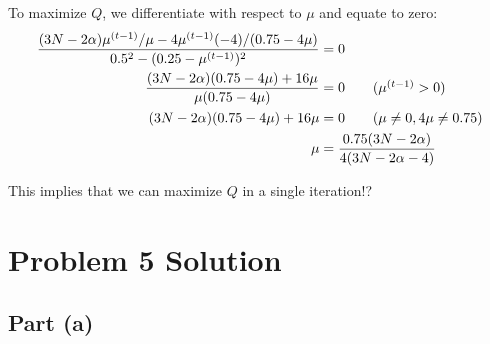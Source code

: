 \documentclass[11pt,a4paper,titlepage]{article}
\begin{document}
To maximize $Q$, we differentiate with respect to $\mu$ and equate to zero:
\begin{align*}
    \frac{(3N-2\alpha)\mu^{(t-1)}/\mu - 4\mu^{(t-1)}(-4)/(0.75-4\mu)}{0.5^2 - (0.25 - \mu^{(t-1)})^2} &= 0 \\
    \frac{(3N-2\alpha)(0.75 - 4\mu) + 16\mu}{\mu(0.75 - 4\mu)} &= 0 \tag{$\mu^{(t-1)} > 0$} \\
    (3N-2\alpha)(0.75 - 4\mu) + 16\mu &= 0 \tag{$\mu \ne 0, 4\mu \ne 0.75$} \\
    \mu &= \frac{0.75(3N - 2\alpha)}{4(3N - 2\alpha - 4)}
\end{align*}

This implies that we can maximize $Q$ in a single iteration!?

\section*{Problem 5 Solution}

\subsection*{Part (a)}
\end{document}
